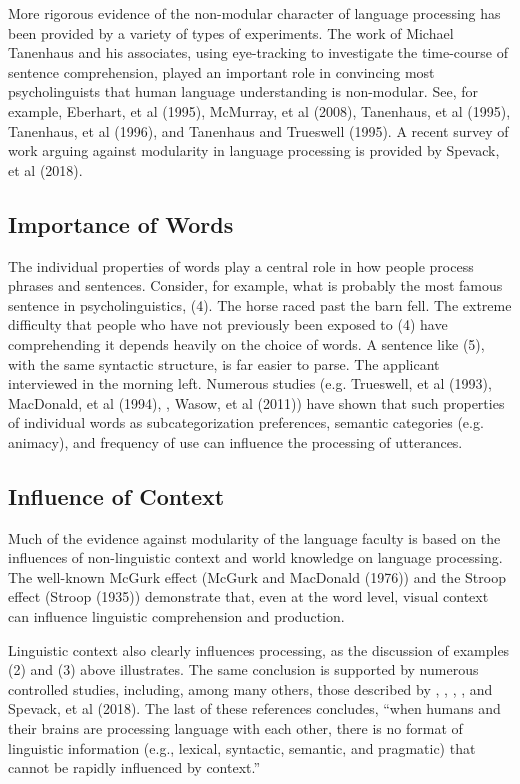 \documentclass[a4paper]{article}
\begin{document}
More rigorous evidence of the non-modular character of language processing has been provided by a variety of types of experiments.  The work of Michael Tanenhaus and his associates, using eye-tracking to investigate the time-course of sentence comprehension, played an important role in convincing most psycholinguists that human language understanding is non-modular.  See, for example, Eberhart, et al (1995), McMurray, et al (2008), Tanenhaus, et al (1995), Tanenhaus, et al (1996), and Tanenhaus and Trueswell (1995). A recent survey of work arguing against modularity in language processing is provided by Spevack, et al (2018).  

\subsection{Importance of Words}

The individual properties of words play a central role in how people process phrases and sentences.  Consider, for example, what is probably the most famous sentence in psycholinguistics, (4).
\ea
The horse raced past the barn fell.
\z
The extreme difficulty that people who have not previously been exposed to (4) have comprehending it depends heavily on the choice of words.  A sentence like (5), with the same syntactic structure, is far easier to parse.
\ea
The applicant interviewed in the morning left.
\z
Numerous studies (e.g. Trueswell, et al (1993), MacDonald, et al (1994), \citet{BresnanEtal2007}, Wasow, et al (2011))  have shown that such properties of individual words as subcategorization preferences, semantic categories (e.g. animacy), and frequency of use can influence the processing of utterances.  

\subsection{Influence of Context}

Much of the evidence against modularity of the language faculty is based on the influences of non-linguistic context and world knowledge on language processing.  The well-known McGurk effect (McGurk and MacDonald (1976)) and the Stroop effect (Stroop (1935)) demonstrate that, even at the word level, visual context can influence linguistic comprehension and production.

Linguistic context also clearly influences processing, as the discussion of examples (2) and (3)
above illustrates.  The same conclusion is supported by numerous controlled studies, including,
among many others, those described by \citet{CS85a}, \citet{AltmannSteedman88},
\citet{Branigan2007}, \citet{TraxlerTooley2007a}, and Spevack, et al (2018).  The last of these references concludes, ``when humans and their brains are processing language with each other, there is no format
of linguistic information (e.g., lexical, syntactic, semantic, and pragmatic) that cannot be rapidly
influenced by context.''
\end{document}
